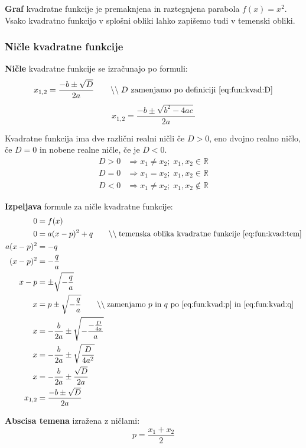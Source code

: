 \documentclass[a4paper,oneside,12pt,fleqn]{article}
\def\R{\ensuremath{\mathbb R}}
\newcommand{\comment}[1]{\ensuremath{\qquad\backslash\backslash\;}\textnormal{#1}}
\renewcommand\implies\Rightarrow
\numberwithin{equation}{section}
\begin{document}
\textbf{Graf} kvadratne funkcije je premaknjena in raztegnjena parabola $f(x) = x^2$. Vsako
kvadratno funkcijo v splošni obliki lahko zapišemo tudi v temenski obliki.

\subsubsection{Ničle kvadratne funkcije}
\label{sec:fun:kvad:nic}
\textbf{Ničle} kvadratne funkcije se izračunajo po formuli:
\begin{equation}
  x_{1,2} = \frac{-b \pm \sqrt{D}}{2a} \comment{$D$ zamenjamo po  definiciji
  \eqref{eq:fun:kvad:D}}
  \label{eq:fun:kvad:nicleD}
\end{equation}
\begin{equation}
  x_{1,2} = \frac{-b \pm \sqrt{b^2 - 4ac}}{2a}
  \label{eq:fun:kvad:nicle}
\end{equation}

Kvadratne funkcija ima dve različni realni ničli če $D > 0$, eno dvojno realno ničlo, če
$D = 0$ in nobene realne ničle, če je $D < 0$.
\begin{align*}
  D > 0 &\implies x_1 \neq x_2; \; x_1, x_2 \in \R \\
  D = 0 &\implies x_1 = x_2; \; x_1, x_2 \in \R \\
  D < 0 &\implies x_1 \neq x_2; \; x_1, x_2 \notin \R
\end{align*}

\textbf{Izpeljava} formule za ničle kvadratne funkcije:
\begin{align*}
  0 &= f(x) \\
  0 &= a(x-p)^2 + q \comment{temenska oblika kvadratne funkcije \eqref{eq:fun:kvad:tem}} \\
  a(x-p)^2 &= -q \\
  (x-p)^2 &= -\frac{q}{a} \\
  x-p &= \pm \sqrt{-\frac{q}{a}} \\
  x &= p \pm \sqrt{-\frac{q}{a}} \comment{zamenjamo $p$ in $q$ po 
  \eqref{eq:fun:kvad:p} in \eqref{eq:fun:kvad:q}} \\
  x &= - \frac{b}{2a} \pm \sqrt{-\frac{-\frac{D}{4a}}{a}} \\
  x &= - \frac{b}{2a} \pm \sqrt{\frac{D}{4a^2}} \\
  x &= - \frac{b}{2a} \pm \frac{\sqrt{D}}{2a} \\
  x_{1,2} &= \frac{-b \pm \sqrt{D}}{2a}
\end{align*}

\textbf{Abscisa temena} izražena z ničlami:
\[ p = \frac{x_1+x_2}{2} \]
\end{document}
